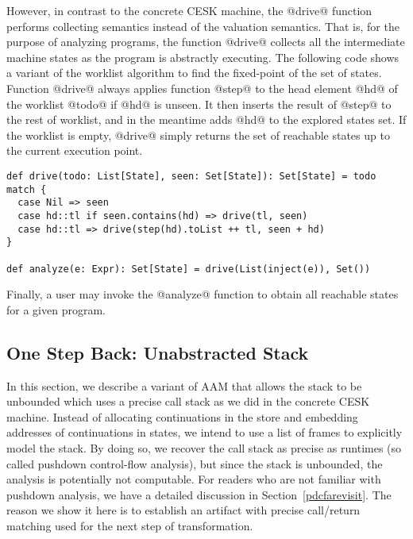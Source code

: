 \documentclass[acmsmall]{acmart}\settopmatter{}
\begin{document}
However, in contrast to the concrete CESK machine, the @drive@ function performs 
collecting semantics instead of the valuation semantics. That is, for the purpose of
analyzing programs, the function @drive@ collects all the intermediate machine states 
as the program is abstractly executing. The following code shows a variant of the 
worklist algorithm to find the fixed-point of the set of states.
Function @drive@ always applies function @step@ to the head element @hd@ of
the worklist @todo@ if @hd@ is unseen. It then inserts the result of @step@ to
the rest of worklist, and in the meantime adds @hd@ to the explored states set.
If the worklist is empty, @drive@ simply returns the set of reachable states
up to the current execution point.

\begin{lstlisting}
def drive(todo: List[State], seen: Set[State]): Set[State] = todo match {
  case Nil => seen
  case hd::tl if seen.contains(hd) => drive(tl, seen)
  case hd::tl => drive(step(hd).toList ++ tl, seen + hd)
}

def analyze(e: Expr): Set[State] = drive(List(inject(e)), Set())
\end{lstlisting}

Finally, a user may invoke the @analyze@ function to obtain all reachable states for 
a given program.


\subsection{One Step Back: Unabstracted Stack} \label{unabs}

In this section, we describe a variant of AAM that allows the stack to be
unbounded which uses a precise call stack as we did in the concrete CESK machine.
Instead of allocating continuations in the store and embedding
addresses of continuations in states, we intend to use a list of frames
to explicitly model the stack.
By doing so, we recover the call stack as precise as runtimes
(so called pushdown control-flow analysis), but since
the stack is unbounded, the analysis is potentially not computable.
For readers who are not familiar with pushdown analysis, we have a detailed
discussion in Section~\ref{pdcfarevisit}.
The reason we show it here is to establish an artifact with precise call/return 
matching used for the next step of transformation.
\end{document}
